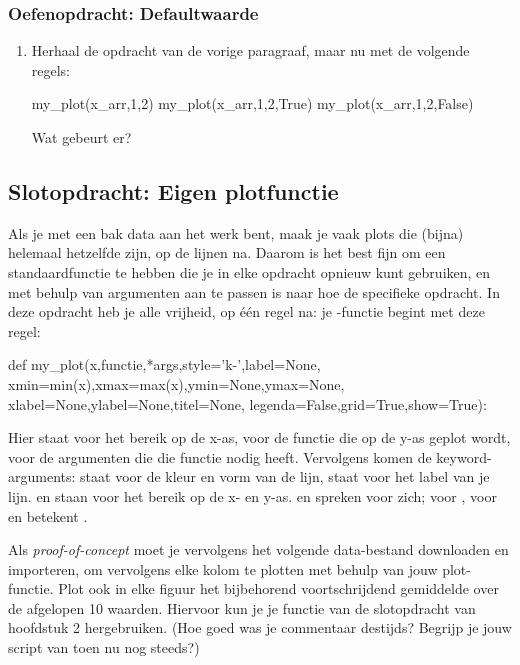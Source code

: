 \documentclass[a4paper,11pt, fleqn]{article}
\begin{document}

\subsubsection*{Oefenopdracht: Defaultwaarde}
\begin{enumerate}
	\item Herhaal de opdracht van de vorige paragraaf, maar nu met de volgende regels:
	\begin{python}
my_plot(x_arr,1,2)
my_plot(x_arr,1,2,True)
my_plot(x_arr,1,2,False)
	\end{python}
	Wat gebeurt er?
\end{enumerate}

\subsection{Slotopdracht: Eigen plotfunctie}
Als je met een bak data aan het werk bent, maak je vaak plots die (bijna) helemaal hetzelfde zijn, op de lijnen na. Daarom is het best fijn om een standaardfunctie te hebben die je in elke opdracht opnieuw kunt gebruiken, en met behulp van argumenten aan te passen is naar hoe de specifieke opdracht. In deze opdracht heb je alle vrijheid, op \'e\'en regel na: je -functie begint met deze regel:

\begin{python}
def my_plot(x,functie,*args,style='k-',label=None,
	    xmin=min(x),xmax=max(x),ymin=None,ymax=None,
	    xlabel=None,ylabel=None,titel=None,
	    legenda=False,grid=True,show=True):
\end{python}
Hier staat  voor het bereik op de x-as,  voor de functie die op de y-as geplot wordt,  voor de argumenten die die functie nodig heeft. Vervolgens komen de keyword-arguments:  staat voor de kleur en vorm van de lijn,  staat voor het label van je lijn.  en  staan voor het bereik op de x- en y-as.  en  spreken voor zich;  voor ,  voor  en  betekent .

Als {\it proof-of-concept} moet je vervolgens het volgende data-bestand downloaden en importeren, om vervolgens elke kolom te plotten met behulp van jouw plot-functie. Plot ook in elke figuur het bijbehorend voortschrijdend gemiddelde over de afgelopen 10 waarden. Hiervoor kun je je functie van de slotopdracht van hoofdstuk 2 hergebruiken. (Hoe goed was je commentaar destijds? Begrijp je jouw script van toen nu nog steeds?)
\end{document}
